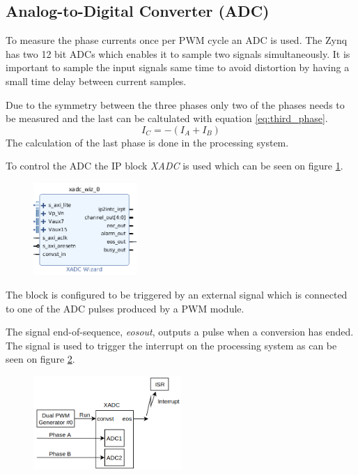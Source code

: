 \subsection{Analog-to-Digital Converter (ADC)}

To measure the phase currents once per PWM cycle an ADC is used. The Zynq has two 12 bit ADCs which enables it to sample two signals simultaneously. It is important to sample the input signals same time to avoid distortion by having a small time delay between current samples. 

Due to the symmetry between the three phases only two of the phases needs to be measured and the last can be caltulated with equation \ref{eq:third_phase}.
\begin{equation}
    I_C = -(I_A + I_B)
    \label{eq:third_phase}
\end{equation}
The calculation of the last phase is done in the processing system.

To control the ADC the IP block \textit{XADC} is used which can be seen on figure \ref{fig:adc_module}. 

\begin{figure}[H]
	\centering
	\includegraphics[width=0.35\textwidth]{pictures/software/adc.png}
	\caption{}
	\label{fig:adc_module}
\end{figure}

The block is configured to be triggered by an external signal which is connected to one of the ADC pulses produced by a PWM module.

The signal end-of-sequence, \textit{eos\textunderscore out}, outputs a pulse when a conversion has ended. The signal is used to trigger the interrupt on the processing system as can be seen on figure \ref{fig:adc_block_diagram}.

\begin{figure}[H]
	\centering
	\includegraphics[width=0.5\textwidth]{pictures/software/adc_block_diagram.png}
	\caption{}
	\label{fig:adc_block_diagram}
\end{figure}



